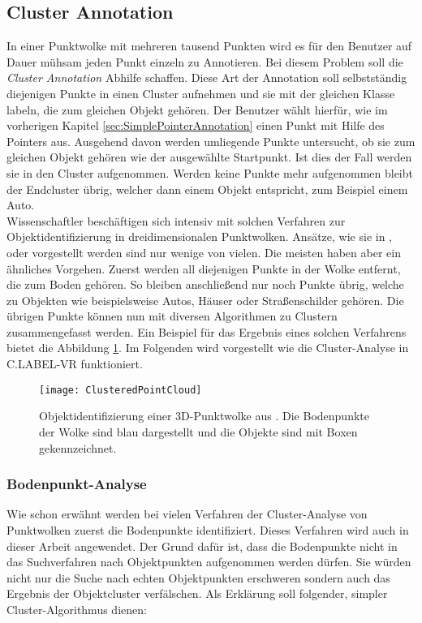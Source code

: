 \subsection{Cluster Annotation}
\label{sec:ClusterLabeling}
In einer Punktwolke mit mehreren tausend Punkten wird es für den Benutzer auf Dauer mühsam jeden Punkt einzeln zu Annotieren. Bei diesem Problem soll die \textit{Cluster Annotation} Abhilfe schaffen. Diese Art der Annotation soll selbstständig diejenigen Punkte in einen Cluster aufnehmen und sie mit der gleichen Klasse labeln, die zum gleichen Objekt gehören. Der Benutzer wählt hierfür, wie im vorherigen Kapitel \ref{sec:SimplePointerAnnotation} einen Punkt mit Hilfe des Pointers aus. Ausgehend davon werden umliegende Punkte untersucht, ob sie zum gleichen Objekt gehören wie der ausgewählte Startpunkt. Ist dies der Fall werden sie in den Cluster aufgenommen. Werden keine Punkte mehr aufgenommen bleibt der Endcluster übrig, welcher dann einem Objekt entspricht, zum Beispiel einem Auto. \\

Wissenschaftler beschäftigen sich intensiv mit solchen Verfahren zur Objektidentifizierung in dreidimensionalen Punktwolken. Ansätze, wie sie in \cite{bib:Segmentation1}, \cite{bib:Segmentation2} oder \cite{bib:Segmentation3} vorgestellt werden sind nur wenige von vielen. Die meisten haben aber ein ähnliches Vorgehen. Zuerst werden all diejenigen Punkte in der Wolke entfernt, die zum Boden gehören. So bleiben anschließend nur noch Punkte übrig, welche zu Objekten wie beispielsweise Autos, Häuser oder Straßenschilder gehören. Die übrigen Punkte können nun mit diversen Algorithmen zu Clustern zusammengefasst werden. Ein Beispiel für das Ergebnis eines solchen Verfahrens bietet die Abbildung \ref{fig:ClusteredCloud}. Im Folgenden wird vorgestellt wie die Cluster-Analyse in C.LABEL-VR funktioniert.

\begin{figure}%
	\centering
    \texttt{[image: ClusteredPointCloud]}
    \caption{Objektidentifizierung einer 3D-Punktwolke aus \cite{bib:Segmentation1}. Die Bodenpunkte der Wolke sind blau dargestellt und die Objekte sind mit Boxen gekennzeichnet.}
    \label{fig:ClusteredCloud}
\end{figure}

\subsubsection{Bodenpunkt-Analyse}
\label{sec:GroundPointSegmentation}
Wie schon erwähnt werden bei vielen Verfahren der Cluster-Analyse von Punktwolken zuerst die Bodenpunkte identifiziert. Dieses Verfahren wird auch in dieser Arbeit angewendet. Der Grund dafür ist, dass die Bodenpunkte nicht in das Suchverfahren nach Objektpunkten aufgenommen werden dürfen. Sie würden nicht nur die Suche nach echten Objektpunkten erschweren sondern auch das Ergebnis der Objektcluster verfälschen. Als Erklärung soll folgender, simpler Cluster-Algorithmus dienen:

